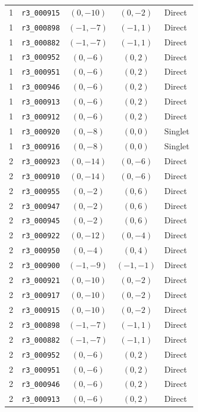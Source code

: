 \begin{longtable}{@{}rlccl@{}}
1 & \texttt{r3\_000915} & $(0,-10)$ & $(0,-2)$ & Direct\\
1 & \texttt{r3\_000898} & $(-1,-7)$ & $(-1,1)$ & Direct\\
1 & \texttt{r3\_000882} & $(-1,-7)$ & $(-1,1)$ & Direct\\
1 & \texttt{r3\_000952} & $(0,-6)$ & $(0,2)$ & Direct\\
1 & \texttt{r3\_000951} & $(0,-6)$ & $(0,2)$ & Direct\\
1 & \texttt{r3\_000946} & $(0,-6)$ & $(0,2)$ & Direct\\
1 & \texttt{r3\_000913} & $(0,-6)$ & $(0,2)$ & Direct\\
1 & \texttt{r3\_000912} & $(0,-6)$ & $(0,2)$ & Direct\\
1 & \texttt{r3\_000920} & $(0,-8)$ & $(0,0)$ & Singlet\\
1 & \texttt{r3\_000916} & $(0,-8)$ & $(0,0)$ & Singlet\\
2 & \texttt{r3\_000923} & $(0,-14)$ & $(0,-6)$ & Direct\\
2 & \texttt{r3\_000910} & $(0,-14)$ & $(0,-6)$ & Direct\\
2 & \texttt{r3\_000955} & $(0,-2)$ & $(0,6)$ & Direct\\
2 & \texttt{r3\_000947} & $(0,-2)$ & $(0,6)$ & Direct\\
2 & \texttt{r3\_000945} & $(0,-2)$ & $(0,6)$ & Direct\\
2 & \texttt{r3\_000922} & $(0,-12)$ & $(0,-4)$ & Direct\\
2 & \texttt{r3\_000950} & $(0,-4)$ & $(0,4)$ & Direct\\
2 & \texttt{r3\_000900} & $(-1,-9)$ & $(-1,-1)$ & Direct\\
2 & \texttt{r3\_000921} & $(0,-10)$ & $(0,-2)$ & Direct\\
2 & \texttt{r3\_000917} & $(0,-10)$ & $(0,-2)$ & Direct\\
2 & \texttt{r3\_000915} & $(0,-10)$ & $(0,-2)$ & Direct\\
2 & \texttt{r3\_000898} & $(-1,-7)$ & $(-1,1)$ & Direct\\
2 & \texttt{r3\_000882} & $(-1,-7)$ & $(-1,1)$ & Direct\\
2 & \texttt{r3\_000952} & $(0,-6)$ & $(0,2)$ & Direct\\
2 & \texttt{r3\_000951} & $(0,-6)$ & $(0,2)$ & Direct\\
2 & \texttt{r3\_000946} & $(0,-6)$ & $(0,2)$ & Direct\\
2 & \texttt{r3\_000913} & $(0,-6)$ & $(0,2)$ & Direct\\

\end{longtable}
